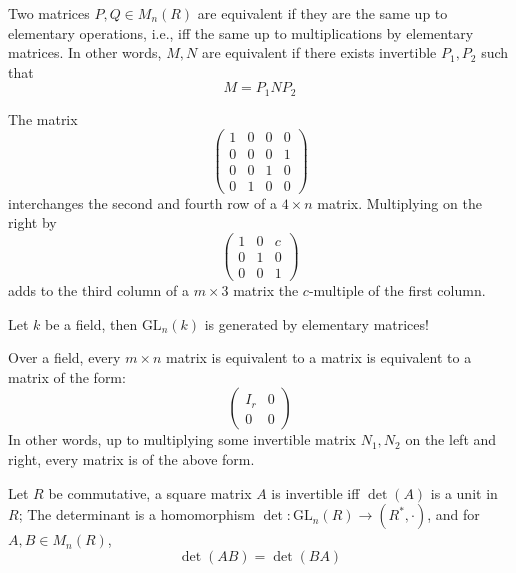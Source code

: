 \documentclass[openany]{book}
\begin{document}
\begin{prop}
    Two matrices $P,Q\in M_{n}(R)$ are equivalent if they are the same up to elementary operations, i.e., iff the same up to multiplications by elementary matrices. In other words, $M,N$ are equivalent if there exists invertible $P_1,P_2$ such that 
    \begin{equation*}
        M=P_1NP_2
    \end{equation*}
\end{prop}
\begin{example}
    The matrix
\[
\begin{pmatrix}
1 & 0 & 0 & 0 \\
0 & 0 & 0 & 1 \\
0 & 0 & 1 & 0 \\
0 & 1 & 0 & 0
\end{pmatrix}
\]
interchanges the second and fourth row of a \(4 \times n\) matrix. Multiplying on the right by
\[
\begin{pmatrix}
1 & 0 & c \\
0 & 1 & 0 \\
0 & 0 & 1
\end{pmatrix}
\]
adds to the third column of a \(m \times 3\) matrix the \(c\)-multiple of the first column.
\end{example}

\begin{prop}
    Let $k$ be a field, then $\text{GL}_n(k)$ is generated by elementary matrices!
\end{prop}

\begin{prop}
    Over a field, every $m\times n$ matrix is equivalent to a matrix is equivalent to a matrix of the form:
    \[ 
\left( 
\begin{array}{c|c} 
I_r & 0 \\ 
\hline 
0 & 0 
\end{array} 
\right) 
\]
 In other words, up to multiplying some invertible matrix $N_1,N_2$ on the left and right, every matrix is of the above form.
\end{prop}


\begin{prop}
    Let $R$ be commutative, a square matrix $A$ is invertible iff $\det(A)$ is a unit in $R$; The determinant is a homomorphism $\det: \text{GL}_n(R)\to(R^*,\cdot)$, and for $A,B\in M_n(R)$, 
    \begin{equation*}
        \det(AB)=\det(BA)
    \end{equation*}
\end{prop}
\end{document}
